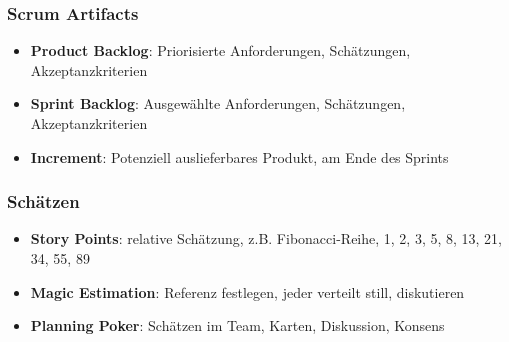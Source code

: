 \documentclass{article}
\begin{document}
\subsubsection{Scrum Artifacts}
\begin{itemize}
  \item \textbf{Product Backlog}: Priorisierte Anforderungen, Schätzungen, Akzeptanzkriterien
  \item \textbf{Sprint Backlog}: Ausgewählte Anforderungen, Schätzungen, Akzeptanzkriterien
  \item \textbf{Increment}: Potenziell auslieferbares Produkt, am Ende des Sprints
\end{itemize}

\subsubsection{Schätzen}
\begin{itemize}
  \item \textbf{Story Points}: relative Schätzung, z.B. Fibonacci-Reihe, 1, 2, 3, 5, 8, 13, 21, 34, 55, 89
  \item \textbf{Magic Estimation}: Referenz festlegen, jeder verteilt still, diskutieren
  \item \textbf{Planning Poker}: Schätzen im Team, Karten, Diskussion, Konsens
\end{itemize}
\end{document}
